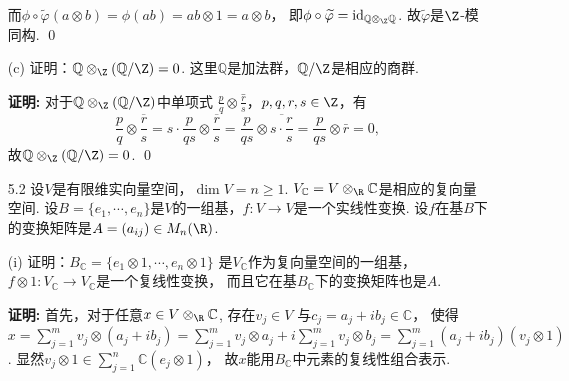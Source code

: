 \begin{enumerate}
        而$\phi \circ \widetilde{\varphi}(a \otimes b) 
        = \phi(ab) = ab \otimes 1 = a \otimes b$，
        即$\phi \circ \widetilde{\varphi} 
        = \operatorname{id}_{\mathbb{Q} \otimes_{\Z} \mathbb{Q}}$. 
        故$\widetilde{\varphi}$是$\Z$-模同构. \qed
        \item[(c)] 证明：$\mathbb{Q} \otimes_{\Z} (\mathbb{Q}/\Z) = 0$. 
        这里$\mathbb{Q}$是加法群，$\mathbb{Q}/\Z$是相应的商群. 
        \item[\textbf{证明:}] 
        对于$\mathbb{Q} \otimes_{\Z} (\mathbb{Q}/\Z)$中单项式
        $\frac{p}{q} \otimes \bar{\frac{r}{s}}$，$p,q,r,s\in\Z$，有
        \[
        \frac{p}{q}\otimes\overline{\frac{r}{s}}=  s\cdot\frac{p}{qs} \otimes \overline{\frac{r}{s}} 
        = \frac{p}{qs} \otimes \overline{s \cdot \frac{r}{s}} = \frac{p}{qs} \otimes \bar{r} = 0,
        \]
        故$\mathbb{Q} \otimes_{\Z} (\mathbb{Q}/\Z)=0$. \qed

    \item[5.2] 设$V$是有限维实向量空间，$\dim V = n \geq 1$. 
    $V_{\mathbb{C}} = V \otimes_{\R} \mathbb{C}$是相应的复向量空间. 
    设$B=\{e_{1},\cdots,e_{n}\}$是$V$的一组基，$f:V \rightarrow V$是一个实线性变换. 
    设$f$在基$B$下的变换矩阵是$A=(a_{ij}) \in M_{n}(\R)$.
    \item[(i)] 证明：$B_{\mathbb{C}} = \{e_{1} \otimes 1,\cdots,e_{n} \otimes 1\}$
        是$V_{\mathbb{C}}$作为复向量空间的一组基，
        $f \otimes 1:V_{\mathbb{C}} \rightarrow V_{\mathbb{C}}$是一个复线性变换，
        而且它在基$B_{\mathbb{C}}$下的变换矩阵也是$A$.
    \item[\textbf{证明:}] 
        首先，对于任意$x \in V \otimes_{\R} \mathbb{C}$, 存在$v_{j} \in V$
        与$c_{j}=a_{j}+ib_{j} \in \mathbb{C}$，
        使得$x = \sum_{j=1}^{m}v_{j} \otimes (a_{j}+ib_{j}) 
        = \sum_{j=1}^{m}v_{j} \otimes a_{j} + i \sum_{j=1}^{m}v_{j} \otimes b_{j} 
        = \sum_{j=1}^{m}(a_{j}+ib_{j})(v_{j} \otimes 1)$. 
        显然$v_{j} \otimes 1 \in \sum_{j=1}^{n}\mathbb{C}(e_{j}\otimes 1)$，
        故$x$能用$B_{\mathbb{C}}$中元素的复线性组合表示. 


\end{enumerate}
